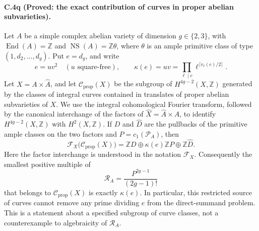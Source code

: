 \paragraph{C.4q (Proved: the exact contribution of curves in proper abelian subvarieties).}
Let $A$ be a simple complex abelian variety of dimension
$g\in\{2,3\}$, with
$\operatorname{End}(A)=\mathbb Z$ and
$\operatorname{NS}(A)=\mathbb Z\theta$, where $\theta$ is an
ample primitive class of type $(1,d_2,\ldots,d_g)$.
Put $e=d_g$, and write
\[
 e=u v^2\quad(u\text{ square-free}),\qquad
 \kappa(e)=uv=\prod_{\ell\mid e}\ell^{\lceil v_\ell(e)/2\rceil}.
\]
Let $X=A\times\widehat A$, and let $\mathcal C_{\mathrm{prop}}(X)$
be the subgroup of $H^{4g-2}(X,\mathbb Z)$ generated by the
classes of integral curves contained in translates of proper
abelian subvarieties of $X$. We use the integral cohomological
Fourier transform, followed by the canonical interchange of the
factors of $\widehat X=\widehat A\times A$, to identify
$H^{4g-2}(X,\mathbb Z)$ with $H^2(X,\mathbb Z)$.
If $D$ and $\widehat D$ are the pullbacks of the primitive ample
classes on the two factors and $P=c_1(\mathcal P_A)$, then
\begin{equation}\label{eq:c4-proper-abelian-curve-lattice}
 \boxed{\quad
 \mathcal F_X\bigl(\mathcal C_{\mathrm{prop}}(X)\bigr)
 =\mathbb ZD\oplus\kappa(e)\mathbb ZP
                    \oplus\mathbb Z\widehat D.
 \quad}
\end{equation}
Here the factor interchange is understood in the notation
$\mathcal F_X$. Consequently the smallest positive multiple of
\[
 \mathcal R_A=\frac{P^{2g-1}}{(2g-1)!}
\]
that belongs to $\mathcal C_{\mathrm{prop}}(X)$ is exactly
$\kappa(e)$. In particular, this restricted source of curves
cannot remove any prime dividing $e$ from the direct-summand
problem. This is a statement about a specified subgroup of
curve classes, not a counterexample to algebraicity of
$\mathcal R_A$.


